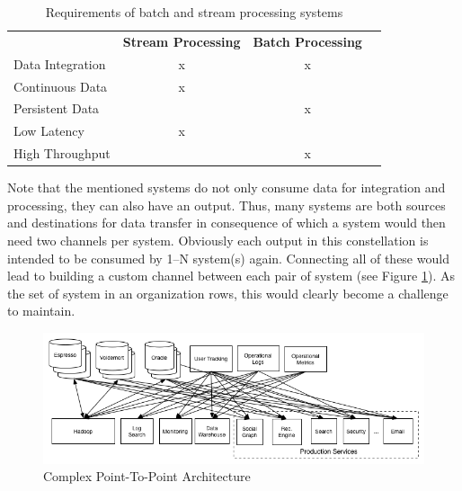 \begin{table}[H]
\centering
\begin{tabular}{l|c|cl}
\multicolumn{1}{c|}{\textbf{}} & \textbf{Stream Processing} & \textbf{Batch
Processing} & \multicolumn{1}{c}{\textbf{}} \\ \cline{1-3}
Data Integration               & x                          & x
&                               \\
Continuous Data                & x                          &
&                               \\
Persistent Data                &                            & x
&                               \\
Low Latency                    & x                          &
&                               \\
High Throughput                     &                            & x
&
\end{tabular}
\caption{Requirements of batch and stream processing systems}
\label{table:requirements-batch-stream}
\end{table}

Note that the mentioned systems  do not only consume data for integration and
processing, they can also have an output. Thus, many systems are both sources and
destinations for data transfer in consequence of which a system would then need
two channels  per system. 
Obviously each output in this constellation is intended to be consumed by 1--N
system(s) again. Connecting all of these would lead to building a custom
channel between each pair of system (see Figure \ref{fig:datapipeline_complex}). As the set of system in an organization
rows, this would clearly become a challenge to maintain.

\begin{figure}[H]
    \centering
    \includegraphics[width=1.0\textwidth]{images/datapipeline_complex.png}
    \caption{Complex Point-To-Point Architecture}
    \label{fig:datapipeline_complex}
\end{figure}

